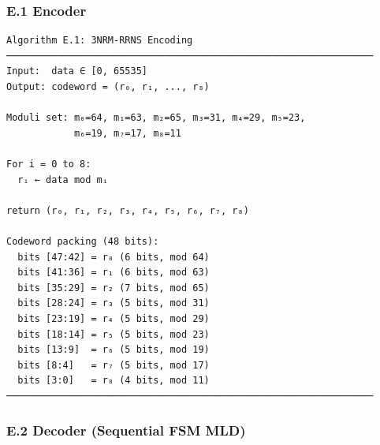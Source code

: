 \subsubsection{E.1 Encoder}\label{e.1-encoder}

\begin{verbatim}
Algorithm E.1: 3NRM-RRNS Encoding
─────────────────────────────────────────────────────────────────
Input:  data ∈ [0, 65535]
Output: codeword = (r₀, r₁, ..., r₈)

Moduli set: m₀=64, m₁=63, m₂=65, m₃=31, m₄=29, m₅=23,
            m₆=19, m₇=17, m₈=11

For i = 0 to 8:
  rᵢ ← data mod mᵢ

return (r₀, r₁, r₂, r₃, r₄, r₅, r₆, r₇, r₈)

Codeword packing (48 bits):
  bits [47:42] = r₀ (6 bits, mod 64)
  bits [41:36] = r₁ (6 bits, mod 63)
  bits [35:29] = r₂ (7 bits, mod 65)
  bits [28:24] = r₃ (5 bits, mod 31)
  bits [23:19] = r₄ (5 bits, mod 29)
  bits [18:14] = r₅ (5 bits, mod 23)
  bits [13:9]  = r₆ (5 bits, mod 19)
  bits [8:4]   = r₇ (5 bits, mod 17)
  bits [3:0]   = r₈ (4 bits, mod 11)
─────────────────────────────────────────────────────────────────
\end{verbatim}

\subsubsection{E.2 Decoder (Sequential FSM
MLD)}\label{e.2-decoder-sequential-fsm-mld}


